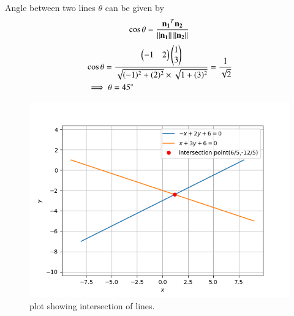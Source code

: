 \documentclass[journal,12pt,twocolumn]{IEEEtran}
\begin{document}
Angle between two lines $\theta$ can be given by
\begin{align}
\cos \theta = \frac{\mathbf{n_1}^T\mathbf{n_2}}{\left\lVert\mathbf{n_1}\right\rVert\left\lVert\mathbf{n_2}\right\rVert}
\end{align}
\begin{align}
&\cos \theta=\frac{\begin{pmatrix}-1&2\end{pmatrix}\begin{pmatrix}1\\3\end{pmatrix}}{\sqrt{(-1)^2 +(2)^2} \times \sqrt{1 +(3)^2}}=\frac{1}{\sqrt{2}}\\
&\implies \theta = 45\degree
\end{align}
\begin{figure}[!ht]
\centering
\includegraphics[width=\columnwidth]{Figure_1.png}
\caption{plot showing intersection of lines.}
\label{Fig_1}
\end{figure}
\end{document}
